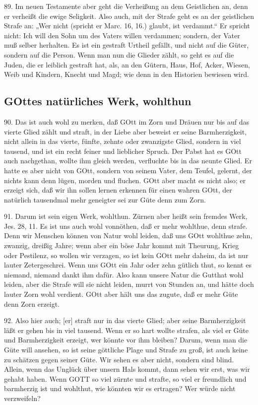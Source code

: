 89. Im neuen Testamente aber geht die Verheißung an dem Geistlichen an, denn er verheißt die ewige Seligkeit. Also auch, mit der Strafe geht es an der geistlichen Strafe an: „Wer nicht (spricht er Marc. 16, 16.) glaubt, ist verdammt.“ Er spricht nicht: Ich will den Sohn um des Vaters willen verdammen; sondern, der Vater muß selber herhalten. Es ist ein gestraft Urtheil gefällt, und nicht auf die Güter, sondern auf die Person. Wenn man nun die Glieder zählt, so geht es auf die Juden, die er leiblich gestraft hat, als, an den Gütern, Haus, Hof, Acker, Wiesen, Weib und Kindern, Knecht und Magd; wie denn in den Historien bewiesen wird.

\subsection{GOttes natürliches Werk, wohlthun}

90. Das ist auch wohl zu merken, daß GOtt im Zorn und Dräuen nur bis auf das vierte Glied zählt und straft, in der Liebe aber beweist er seine Barmherzigkeit, nicht allein in das vierte, fünfte, zehnte oder zwanzigste Glied, sondern in viel tausend, und ist ein recht feiner und lieblicher Spruch. Der Pabst hat es GOtt auch nachgethan, wollte ihm gleich werden, verfluchte bis in das neunte Glied. Er hatte es aber nicht von GOtt, sondern von seinem Vater, dem Teufel, gelernt, der nichts kann denn lügen, morden und fluchen. GOtt aber macht es nicht also; er erzeigt sich, daß wir ihn sollen lernen erkennen für einen wahren GOtt, der natürlich tausendmal mehr geneigter sei zur Güte denn zum Zorn.

91. Darum ist sein eigen Werk, wohlthun. Zürnen aber heißt sein fremdes Werk, Jes. 28, 11. Es ist uns auch wohl vonnöthen, daß er mehr wohlthue, denn strafe. Denn wir Menschen können von Natur wohl leiden, daß uns GOtt wohlthue zehn, zwanzig, dreißig Jahre; wenn aber ein böse Jahr kommt mit Theurung, Krieg oder Pestilenz, so wollen wir verzagen, so ist kein GOtt mehr daheim, da ist nur lauter Zetergeschrei. Wenn uns GOtt ein Jahr oder zehn gütlich thut, so kennt es niemand, niemand dankt ihm dafür. Also kann unsere Natur die Gutthat wohl leiden, aber die Strafe will sie nicht leiden, murrt von Stunden an, und hätte doch lauter Zorn wohl verdient. GOtt aber hält uns das zugute, daß er mehr Güte denn Zorn erzeigt.

92. Also hier auch; [er] straft nur in das vierte Glied; aber seine Barmherzigkeit läßt er gehen bis in viel tausend. Wenn er so hart wollte strafen, als viel er Güte und Barmherzigkeit erzeigt, wer könnte vor ihm bleiben? Darum, wenn man die Güte will ansehen, so ist seine göttliche Plage und Strafe zu groß, ist
auch keine zu schätzen gegen seiner Güte. Wir sehen es aber nicht, sondern sind blind. Allein, wenn das Unglück über unsern Hals kommt, dann sehen wir erst, was wir gehabt haben. Wenn GOTT so viel zürnte und strafte, so viel er freundlich und barmherzig ist und wohlthut, wie könnten wir es ertragen? Wer würde nicht verzweifeln?

